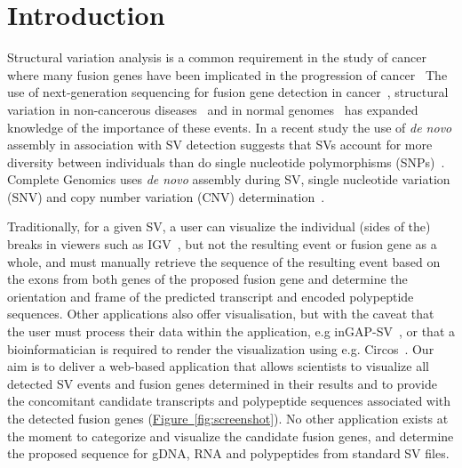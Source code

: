 \section*{Introduction}

Structural variation analysis is a common requirement in the study of cancer where many fusion genes have been implicated in the progression of cancer~\cite{mitelman2007impact, kumar2008recurrent}
The use of next-generation sequencing for fusion gene detection in cancer~\cite{edgren2011identification, ge2011fusionmap, mcpherson2011defuse}, structural variation in non-cancerous diseases~\cite{sanders2011multiple, levy2011rare} and in normal genomes~\cite{10002010map} has expanded knowledge of the importance of these events.
In a recent study the use of \textit{de novo} assembly in association with SV detection suggests that SVs account for more diversity between individuals than do single nucleotide polymorphisms (SNPs)~\cite{li2011structural}. Complete Genomics uses \textit{de novo} assembly during SV, single nucleotide variation (SNV) and copy number variation (CNV) determination~\cite{carnevali2012computational}.

Traditionally, for a given SV, a user can visualize the individual (sides of the) breaks in viewers such as IGV~\cite{thorvaldsdottir2013integrative,robinson2011integrative}, but not the resulting event or fusion gene as a whole, and must manually retrieve the sequence of the resulting event based on the exons from both genes of the proposed fusion gene and determine the orientation and frame of the predicted transcript and encoded polypeptide sequences. Other applications also offer visualisation, but with the caveat that the user must process their data within the application, e.g inGAP-SV~\cite{qi2011ingap}, or that a bioinformatician is required to render the visualization using e.g. Circos~\cite{krzywinski2009circos}. Our aim is to deliver a web-based application that allows scientists to visualize all detected SV events and fusion genes determined in their results and to provide the concomitant candidate transcripts and polypeptide sequences associated with the detected fusion genes (\hyperref[fig:screenshot]{Figure~\ref*{fig:screenshot}}). No other application exists at the moment to categorize and visualize the candidate fusion genes, and determine the proposed sequence for gDNA, RNA and polypeptides from standard SV files.

